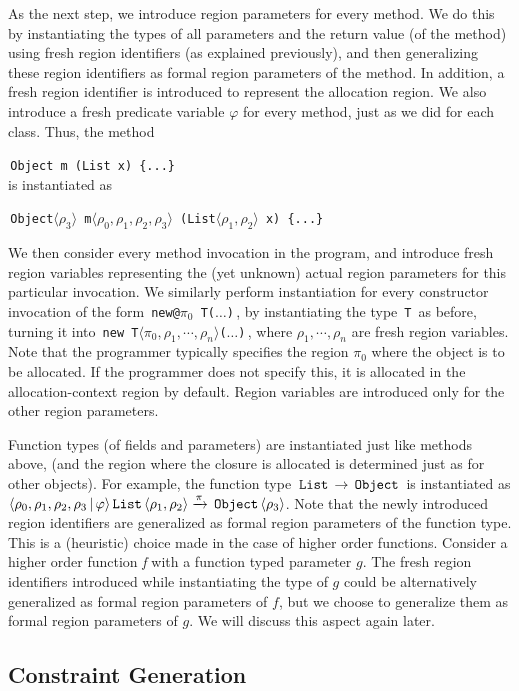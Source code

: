 \documentclass[a4paper,UKenglish]{lipics-v2018}
\newcommand{\C}[1]{\code{#1}}
\newcommand{\code}[1]{\,{\tt #1}\,}
\newcommand{\inang}[1]{\langle #1 \rangle}
\begin{document}
As the next step, we introduce region parameters for every method.  We
do this by instantiating the types of all parameters and the return
value (of the method) using fresh region identifiers (as explained
previously), and then generalizing these region identifiers as formal
region parameters of the method. In addition, a fresh region
identifier is introduced to represent the allocation region.  We also
introduce a fresh predicate variable $\varphi$ for every method, just
as we did for each class.  Thus, the method

\C{Object m (List x) \{...\} } \\
is instantiated as

\C{Object$\inang{\rho_3}$ m$\inang{\rho_0,\rho_1,\rho_2,\rho_3}$ (List$\inang{\rho_1,\rho_2}$ x) \{...\} }

We then consider every method invocation in the program, and introduce
fresh region variables representing the (yet unknown) actual region
parameters for this particular invocation.
%
We similarly perform instantiation for every constructor invocation of
the form \C{new@$\pi_0$ T($\ldots$)}, by instantiating the type \C{T}
as before, turning it into \C{new T$\langle \pi_0, \rho_1, \cdots,
\rho_n \rangle$($\ldots$)}, where $\rho_1, \cdots, \rho_n$ are fresh
region variables. Note that the programmer typically specifies the
region $\pi_0$ where the object is to be allocated. If the programmer
does not specify this, it is allocated in the allocation-context
region by default. Region variables are introduced only for the other
region parameters.

Function types (of fields and parameters) are instantiated just like
methods above, (and the region where the closure is allocated is
determined just as for other objects).  For example, the function type
$\C{List} \rightarrow \C{Object}$ is instantiated as $\inang{\rho_0,
\rho_1, \rho_2, \rho_3 \,|\, \varphi } \C{List} \inang{\rho_1,\rho_2}
\xrightarrow{\pi} \C{Object}\inang{\rho_3}$.  Note that the newly
introduced region identifiers are generalized as formal region
parameters of the function type.  This is a (heuristic) choice made in
the case of higher order functions.  Consider a higher order function
\emph{f} with a function typed parameter $g$.  The fresh region
identifiers introduced while instantiating the type of $g$ could be
alternatively generalized as formal region parameters of $f$, but we
choose to generalize them as formal region parameters of $g$.  We will
discuss this aspect again later.

\subsection{Constraint Generation}
\label{sec:fb-constraintsem}
\end{document}
